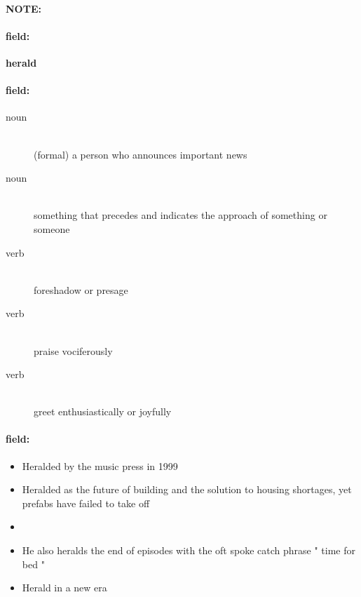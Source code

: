\documentclass[12pt]{article}
\newenvironment{note}{\paragraph{NOTE:}}{}
\newenvironment{field}{\paragraph{field:}}{}
\begin{document}
\begin{note}
\begin{field}
\textbf{\large herald}
\end{field}


\begin{field}
\begin{description}
\item[noun] \hfill \\ 
(formal) a person who announces important news

\item[noun] \hfill \\ 
something that precedes and indicates the approach of something or someone

\item[verb] \hfill \\ 
foreshadow or presage

\item[verb] \hfill \\ 
praise vociferously

\item[verb] \hfill \\ 
greet enthusiastically or joyfully

\end{description}
\end{field}

\begin{field}
\begin{itemize}
\item Heralded by the music press in 1999
\item Heralded as the future of building and the solution to housing shortages, yet prefabs have failed to take off
\item 
\item He also heralds the end of episodes with the oft spoke catch phrase " time for bed " 
\item Herald in a new era
\end{itemize}
\end{field}
\end{note}
\end{document}
